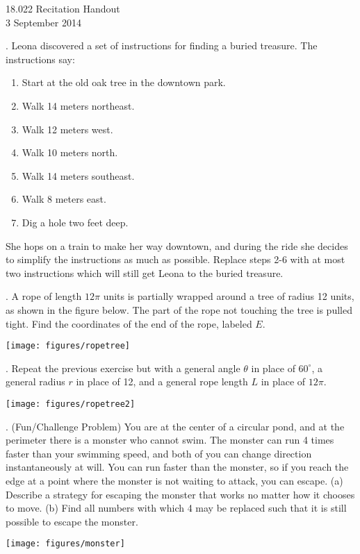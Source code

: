 \documentclass[11pt]{article}
\theoremstyle{definition}
\newcounter{prob}
\newcommand\itm{\theprob.  \stepcounter{prob}}
\begin{document}
\thispagestyle{empty}

\begin{center}
  18.022 Recitation Handout \\
  3 September 2014 \\
\end{center}

\itm Leona discovered a set of instructions for finding a buried treasure. The instructions say:
\begin{enumerate}
\item Start at the old oak tree in the downtown park. 
\item Walk 14 meters northeast. 
\item Walk 12 meters west. 
\item Walk 10 meters north. 
\item Walk 14 meters southeast. 
\item Walk 8 meters east. 
\item Dig a hole two feet deep. 
\end{enumerate}
She hops on a train to make her way downtown, and during the ride she decides to simplify the instructions as much as possible. Replace steps 2-6 with at most two instructions which will still get Leona to the buried treasure. 


\itm A rope of length $12\pi$ units is partially wrapped around a tree of radius 12 units, as shown in the figure below. The part of the rope not touching the tree is pulled tight. Find the coordinates of the end of the rope, labeled $E$. 
\begin{center}
  \texttt{[image: figures/ropetree]}
\end{center}

\newpage

\itm Repeat the previous exercise but with a general angle $\theta$ in place of $60^\circ$, a general radius $r$ in place of 12, and a general rope length $L$ in place of $12\pi$. 
\begin{center}
  \texttt{[image: figures/ropetree2]}
\end{center}

\itm (Fun/Challenge Problem) You are at the center of a circular pond, and
at the perimeter there is a monster who cannot swim. The monster can run 4
times faster than your swimming speed, and both of you can change direction
instantaneously at will. You can run faster than the monster, so if you
reach the edge at a point where the monster is not waiting to attack, you
can escape. (a) Describe a strategy for escaping the monster that works no
matter how it chooses to move. (b) Find all numbers with which 4 may be
replaced such that it is still possible to escape the monster. 

\begin{center}
  \texttt{[image: figures/monster]}
\end{center}
\end{document}
